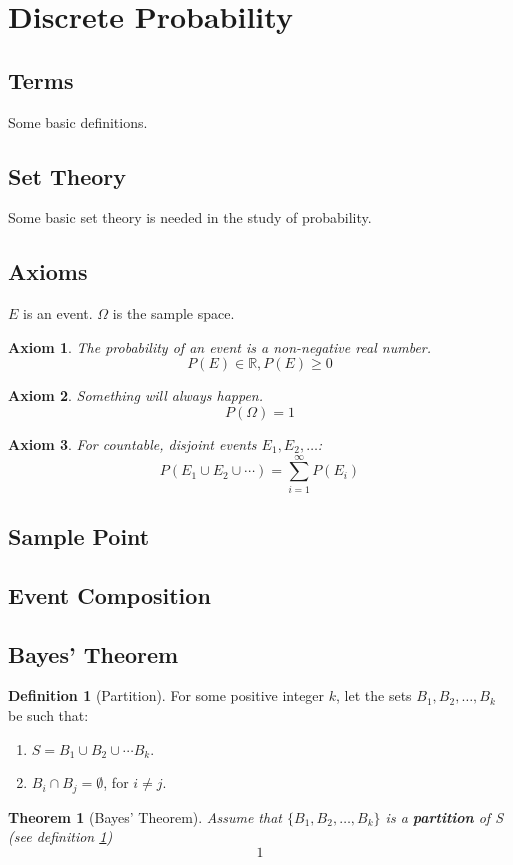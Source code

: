 \documentclass{article}
\newtheorem{axiom}{Axiom}
\newtheorem{thm}{Theorem}[section]
\theoremstyle{definition}
\newtheorem{defn}{Definition}[section]
\begin{document}
% 

\section{Discrete Probability}

\subsection{Terms}
Some basic definitions.

\subsection{Set Theory}
Some basic set theory is needed in the study of probability.

\subsection{Axioms}
$E$ is an event. $\Omega$ is the sample space.
\begin{axiom} \label{axiom1}
The probability of an event is a non-negative real number.
$$
P(E) \in \mathbb{R}, P(E) \geq 0
$$
\end{axiom}

\begin{axiom} \label{axiom2}
Something will always happen.
$$
P(\Omega) = 1
$$
\end{axiom}

\begin{axiom} \label{axiom3}
For countable, disjoint events $E_1,E_2,\ldots$:
$$ 
P(E_1 \cup E_2 \cup \cdots) = \displaystyle \sum_{i=1}^{\infty} P(E_i)
$$
\end{axiom}

\subsection{Sample Point}

\subsection{Event Composition}

\subsection{Bayes' Theorem}
\begin{defn}[Partition] \label{part}
For some positive integer $k$, let the sets $B_1,B_2,\ldots,B_k$ be such that:
\begin{enumerate}
\item $S = B_1 \cup B_2 \cup \cdots B_k$.
\item $B_i \cap B_j = \emptyset$, for $i \not = j$.
\end{enumerate}
\end{defn}
\begin{thm}[Bayes' Theorem] \label{bayes}
Assume that $\{B_1,B_2,\ldots,B_k\}$ is a \textbf{partition} of S (see definition \ref{part})
$$
1
$$
\end{thm}
\end{document}
